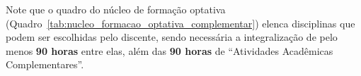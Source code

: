 Note que o quadro do núcleo de formação optativa (Quadro~\ref{tab:nucleo_formacao_optativa_complementar}) elenca disciplinas que podem ser escolhidas pelo discente, sendo necessária a integralização de pelo menos \textbf{90 horas} entre elas, além das \textbf{90 horas} de ``Atividades Acadêmicas Complementares''.
